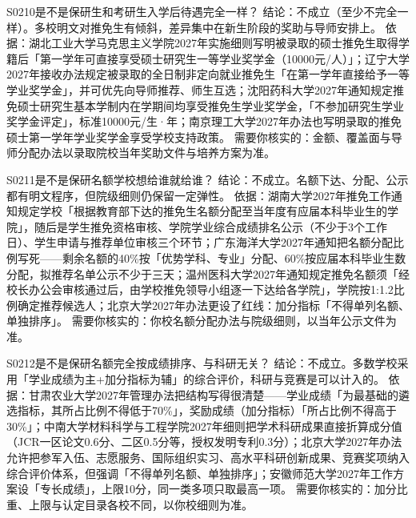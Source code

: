 \begin{qa}{S0210}{是不是保研生和考研生入学后待遇完全一样？}
结论：不成立（至少不完全一样）。多校明文对推免生有倾斜，差异集中在新生阶段的奖助与导师安排上。
依据：湖北工业大学马克思主义学院2027年实施细则写明被录取的硕士推免生取得学籍后「第一学年可直接享受硕士研究生一等学业奖学金（10000元/人）」；辽宁大学2027年接收办法规定被录取的全日制非定向就业推免生「在第一学年直接给予一等学业奖学金」，并可优先向导师推荐、师生互选；沈阳药科大学2027年通知规定推免硕士研究生基本学制内在学期间均享受推免生学业奖学金，「不参加研究生学业奖学金评定」，标准10000元/生·年；南京理工大学2027年办法也写明录取的推免硕士第一学年学业奖学金享受学校支持政策。
需要你核实的：金额、覆盖面与导师分配办法以录取院校当年奖助文件与培养方案为准。
\end{qa}

\begin{qa}{S0211}{是不是保研名额学校想给谁就给谁？}
结论：不成立。名额下达、分配、公示都有明文程序，但院级细则仍保留一定弹性。
依据：湖南大学2027年推免工作通知规定学校「根据教育部下达的推免生名额分配至当年度有应届本科毕业生的学院」，随后是学生推免资格审核、学院学业综合成绩排名公示（不少于3个工作日）、学生申请与推荐单位审核三个环节；广东海洋大学2027年通知把名额分配比例写死——剩余名额的40\%按「优势学科、专业」分配、60\%按应届本科毕业生数分配，拟推荐名单公示不少于三天；温州医科大学2027年通知规定推免名额须「经校长办公会审核通过后，由学校推免领导小组逐一下达给各学院」，学院按1:1.2比例确定推荐候选人；北京大学2027年办法更设了红线：加分指标「不得单列名额、单独排序」。
需要你核实的：你校名额分配办法与院级细则，以当年公示文件为准。
\end{qa}

\begin{qa}{S0212}{是不是保研名额完全按成绩排序、与科研无关？}
结论：不成立。多数学校采用「学业成绩为主+加分指标为辅」的综合评价，科研与竞赛是可以计入的。
依据：甘肃农业大学2027年管理办法把结构写得很清楚——学业成绩「为最基础的遴选指标，其所占比例不得低于70\%」，奖励成绩（加分指标）「所占比例不得高于30\%」；中南大学材料科学与工程学院2027年细则把学术科研成果直接折算成分值（JCR一区论文0.6分、二区0.5分等，授权发明专利0.3分）；北京大学2027年办法允许把参军入伍、志愿服务、国际组织实习、高水平科研创新成果、竞赛奖项纳入综合评价体系，但强调「不得单列名额、单独排序」；安徽师范大学2027年工作方案设「专长成绩」，上限10分，同一类多项只取最高一项。
需要你核实的：加分比重、上限与认定目录各校不同，以你校细则为准。
\end{qa}

